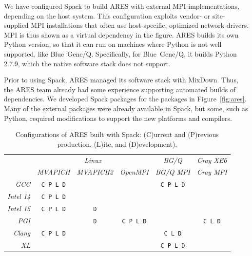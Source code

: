 We have configured Spack to build ARES with external MPI implementations, 
depending on the host system. This configuration exploits vendor- 
or site-supplied MPI installations that often use host-specific, optimized 
network drivers. MPI is thus shown as a virtual dependency in the figure.
ARES builds its own Python version, so that it can run on machines
where Python is not well supported, like Blue~Gene/Q.  Specifically, for
Blue~Gene/Q, it builds Python 2.7.9, which the native software stack
does not support.

Prior to using Spack, ARES managed its software stack with MixDown.
Thus, the ARES team already had some experience supporting 
automated builds of dependencies. We developed Spack packages for the 
packages in Figure~\ref{fig:ares}. Many of the external packages were already 
available in Spack, but some, such as Python, required modifications to support
the new platforms and compilers.

\newcommand{\hfmt}[1]{\textit{\scriptsize #1}}
\newcommand{\cfmt}[1]{\texttt{\scriptsize #1}}

\begin{table}\centering %
\footnotesize
\begin{tabular}{|r|c|c|c|c|c|}
\hline
\multirow{2}{*}{} & \multicolumn{3}{|c|}{\hfmt{Linux}}                      & {\hfmt{BG/Q}}     & {\hfmt{Cray XE6}} \\\cline{2-6}
                  & {\hfmt{MVAPICH}} & {\hfmt{MVAPICH2}} & {\hfmt{OpenMPI}} & {\hfmt{BG/Q MPI}} & {\hfmt{Cray MPI}} \\\hline
{\hfmt{GCC}}      & {\cfmt{C P L D}} &                   &                  & {\cfmt{C P L D}}  &                   \\\hline
{\hfmt{Intel 14}} & {\cfmt{C P L D}} &                   &                  &                   &                   \\\hline
{\hfmt{Intel 15}} & {\cfmt{C P L D}} & {\cfmt{D}}        &                  &                   &                   \\\hline
{\hfmt{PGI}}      &                  & {\cfmt{D}}        & {\cfmt{C P L D}} &                   & {\cfmt{C L D}}    \\\hline
{\hfmt{Clang}}    & {\cfmt{C P L D}} &                   &                  & {\cfmt{C L D}}    &                   \\\hline
{\hfmt{XL}}       &                  &                   &                  & {\cfmt{C P L D}}  &                   \\\hline
\end{tabular}
\caption{
	Configurations of ARES built with Spack: \newline
	(C)urrent and
	(P)revious production, (L)ite, and (D)evelopment).
	\label{tab:ares-configs}
}
\end{table}

